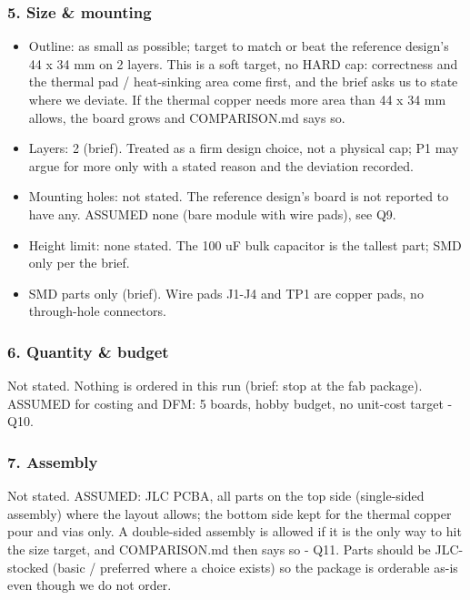 \documentclass[11pt]{article}
\begin{document}
\subsubsection*{5. Size \& mounting}
\begin{itemize}
\item Outline: as small as possible; target to match or beat the reference design's 44 x 34 mm on 2 layers. This is a
soft target, no HARD cap: correctness and the thermal pad / heat-sinking area come first, and the
brief asks us to state where we deviate. If the thermal copper needs more area than 44 x 34 mm
allows, the board grows and COMPARISON.md says so.
\item Layers: 2 (brief). Treated as a firm design choice, not a physical cap; P1 may argue for more only
with a stated reason and the deviation recorded.
\item Mounting holes: not stated. The reference design's board is not reported to have any. ASSUMED none (bare module
with wire pads), see Q9.
\item Height limit: none stated. The 100 uF bulk capacitor is the tallest part; SMD only per the brief.
\item SMD parts only (brief). Wire pads J1-J4 and TP1 are copper pads, no through-hole connectors.
\end{itemize}
\subsubsection*{6. Quantity \& budget}
Not stated. Nothing is ordered in this run (brief: stop at the fab package). ASSUMED for costing and DFM: 5 boards, hobby budget, no unit-cost target - Q10.

\subsubsection*{7. Assembly}
Not stated. ASSUMED: JLC PCBA, all parts on the top side (single-sided assembly) where the layout allows; the bottom side kept for the thermal copper pour and vias only. A double-sided assembly is allowed if it is the only way to hit the size target, and COMPARISON.md then says so - Q11. Parts should be JLC-stocked (basic / preferred where a choice exists) so the package is orderable as-is even though we do not order.
\end{document}
